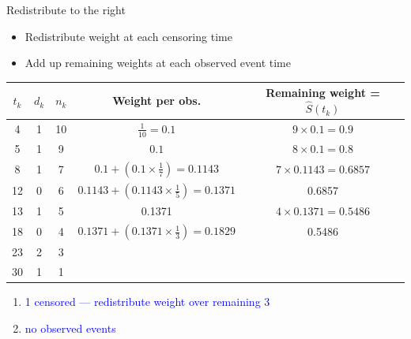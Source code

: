 \documentclass[10pt,t]{beamer}
\begin{document}
\begin{frame}{Redistribute to the right}
	
	\vspace{-5 mm}
	
	\begin{itemize}
		\item Redistribute weight at each censoring time
		
		\medskip
		
		\item Add up remaining weights at each observed event time
	\end{itemize}

\smallskip

	\begin{footnotesize}
		\begin{center}
		\begin{tabular}{|c|c|c|c|c|}
			\hline
			$t_k$ & $d_k$ & $n_k$ & Weight per obs. & Remaining weight = $\widehat{S}(t_k)$ \\
			\hline
			4 & 1 & 10 & $\frac{1}{10} = 0.1$ & $9\times 0.1= 0.9$\\
			5 & 1 & 9 & $0.1$ &  $8\times 0.1= 0.8$  \\
			8 & 1 & 7 & $0.1 + (0.1\times \frac{1}{7}) = 0.1143$ & $7 \times 0.1143 = 0.6857$\\
			12 & 0 & 6 & $0.1143 +  (0.1143\times\frac{1}{5}) = 0.1371$ &  0.6857\\
			13 & 1 & 5 & 0.1371 & $4 \times 0.1371 =0.5486 $\\
			18 & 0 & 4 & $0.1371 + (0.1371\times \frac{1}{3}) = 0.1829$ & 0.5486\\
			23 & 2 & 3 & & \\
			30 & 1 & 1 & & \\
			\hline
		\end{tabular}
	\end{center}
	\end{footnotesize}

\medskip
	\begin{enumerate}
		\item \textcolor{blue}{1 censored --- redistribute weight over remaining 3}
		
		\medskip
		
		\item \textcolor{blue}{no observed events}
	\end{enumerate}
\end{frame}
\end{document}
